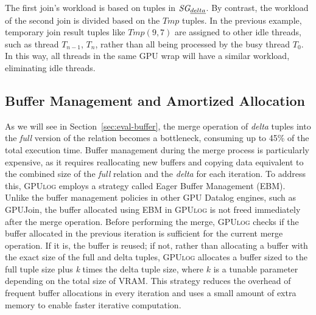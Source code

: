 \documentclass[nonacm,sigplan]{acmart}
\newcommand{\tool}{\textsc{GPUlog}}
\newcommand{\revised}[1]{{#1}}
\begin{document}
The first join's workload is based on tuples in $\textit{SG}_{\emph{delta}}$. By contrast, the workload of the second join is \revised{divided} based on the $\textit{Tmp}$  tuples. In the previous example, temporary join result tuples like $\textit{Tmp}(9, 7)$ are assigned to other idle threads, such as thread $T_{n-1}$, $T_n$, rather than all being processed by the busy thread $T_0$. In this way, all threads in the same GPU wrap will have a similar workload, eliminating idle threads.




\subsection{Buffer Management and Amortized Allocation}
\label{sec:impl-buffer}

\revised{As we will see in Section~\ref{sec:eval-buffer}, the merge operation of \emph{delta} tuples into the \emph{full} version of the relation becomes a bottleneck, consuming up to 45\% of the total execution time. Buffer management during the merge process is particularly expensive, as it requires reallocating new buffers and copying data equivalent to the combined size of the \emph{full} relation and the \emph{delta} for each iteration. To address this, \tool{} employs a strategy called Eager Buffer Management (EBM).
Unlike the buffer management policies in other GPU Datalog engines, such as GPUJoin, the buffer allocated using EBM in \tool{} is not freed immediately after the merge operation. Before performing the merge, \tool{} checks if the buffer allocated in the previous iteration is sufficient for the current merge operation. If it is, the buffer is reused; if not, rather than allocating a buffer with the exact size of the full and delta tuples, \tool{} allocates a buffer sized to the full tuple size plus \textit{k} times the delta tuple size, where  $k$  is a tunable parameter depending on the total size of VRAM. This strategy reduces the overhead of frequent buffer allocations in every iteration and uses a small amount of extra memory to enable faster iterative computation.}
\end{document}

